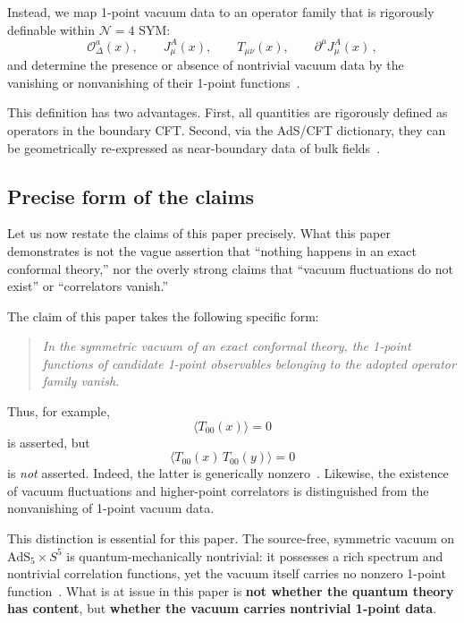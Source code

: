 \documentclass[
  aps,
  prd,
  preprint,
  groupedaddress,
  nofootinbib,
  longbibliography
]{revtex4-2}
\theoremstyle{remark}
\newcommand{\N}{\mathcal{N}}
\newcommand{\AdS}{\mathrm{AdS}}
\begin{document}
Instead, we map 1-point vacuum data to an operator family
that is rigorously definable within $\N=4$ SYM:
\begin{equation}\label{eq:Cex-def}
  \mathcal{O}_\Delta^a(x),\qquad
  J_\mu^A(x),\qquad
  T_{\mu\nu}(x),\qquad
  \partial^\mu J_\mu^A(x)\,,
\end{equation}
and determine the presence or absence of nontrivial vacuum
data by the vanishing or nonvanishing of their 1-point
functions~\cite{ref5,ref9,ref10,ref11,ref12,ref13,ref14}.

This definition has two advantages.
First, all quantities are rigorously defined as operators in
the boundary CFT\@.
Second, via the AdS/CFT dictionary, they can be geometrically
re-expressed as near-boundary data of bulk
fields~\cite{ref2,ref3,ref9,ref10,ref11,ref12}.

\subsection{Precise form of the claims}\label{subsec:1-5}

Let us now restate the claims of this paper precisely.
What this paper demonstrates is not the vague assertion that
``nothing happens in an exact conformal theory,''
nor the overly strong claims that ``vacuum fluctuations do
not exist'' or ``correlators vanish.''

The claim of this paper takes the following specific form:

\begin{quote}
\textit{In the symmetric vacuum of an exact conformal theory,
the 1-point functions of candidate 1-point observables
belonging to the adopted operator family vanish.}
\end{quote}

Thus, for example,
\begin{equation}\label{eq:T00-vanish}
  \langle T_{00}(x)\rangle = 0
\end{equation}
is asserted, but
\begin{equation}\label{eq:T00T00-not-claimed}
  \langle T_{00}(x)\,T_{00}(y)\rangle = 0
\end{equation}
is \emph{not} asserted.
Indeed, the latter is generically
nonzero~\cite{ref5,ref13,ref14}.
Likewise, the existence of vacuum fluctuations and
higher-point correlators is distinguished from the
nonvanishing of 1-point vacuum data.

This distinction is essential for this paper.
The source-free, symmetric vacuum on $\AdS_5\times S^5$ is
quantum-mechanically nontrivial: it possesses a rich spectrum
and nontrivial correlation functions, yet the vacuum itself
carries no nonzero 1-point
function~\cite{ref1,ref2,ref3,ref4,ref5,ref6,ref7,ref9,ref10,ref11,ref12,ref13,ref14}.
What is at issue in this paper is \textbf{not whether the
quantum theory has content}, but \textbf{whether the vacuum
carries nontrivial 1-point data}.
\end{document}
